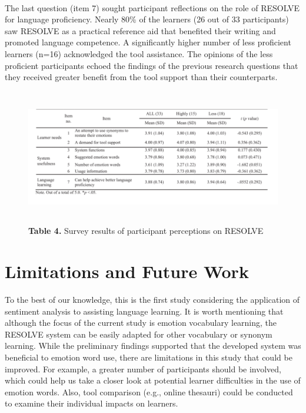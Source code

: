 \documentclass[a4paper,12pt,oneside]{article}
\let\counterwithin\relax
\begin{document}
\paragraph{}
The last question (item 7) sought participant reflections on the role of RESOLVE for language proficiency. Nearly 80\% of the learners (26 out of 33 participants) saw RESOLVE as a practical reference aid that benefited their writing and promoted language competence. A significantly higher number of less proficient learners (n=16) acknowledged the tool assistance. The opinions of the less proficient participants echoed the findings of the previous research questions that they received greater benefit from the tool support than their counterparts. 

\begin{figure}[H]
\includegraphics[height=5.9cm,width=15.4cm]{Table4.png}
\centering
\caption{\textbf{Table 4.} Survey results of participant perceptions on RESOLVE}
\end{figure}

\newpage
\section{Limitations and Future Work}
To the best of our knowledge, this is the first study considering the application of sentiment analysis to assisting language learning. It is worth mentioning that although the focus of the current study is emotion vocabulary learning, the RESOLVE system can be easily adapted for other vocabulary or synonym learning. While the preliminary findings supported that the developed system was beneficial to emotion word use, there are limitations in this study that could be improved. For example, a greater number of participants should be involved, which could help us take a closer look at potential learner difficulties in the use of emotion words. Also, tool comparison (e.g., online thesauri) could be conducted to examine their individual impacts on learners. 
\end{document}
